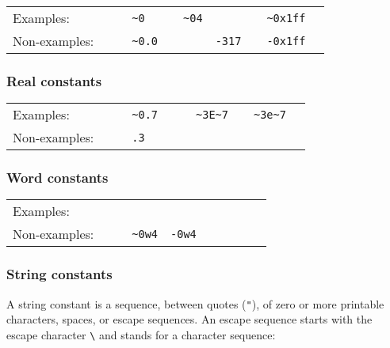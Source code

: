 \documentclass[fleqn]{article}
\begin{document}
\begin{quot}
\begin{tabular}{@{}lcllllllll}
Examples:   & &  \verb#0# & \verb#~0# & \verb#4# & \verb#~04# &
\verb#999999# & \verb#0xFFFF# & \verb#~0x1ff#\\
Non-examples: & & \verb#0.0# & \verb#~0.0# & \verb#4.0# & \verb#1E0# &
\verb#-317# & \verb#0XFFFF# & \verb#-0x1ff#\\
\end{tabular}
\end{quot}


\subsubsection*{Real constants}

\begin{quot}
\begin{tabular}{@{}lcllllllll}
Examples:   & &  \verb#0.7# & \verb#~0.7# & \verb#3.32E5# & \verb#3E~7#
 & \verb#~3E~7#  & \verb#3e~7# & \verb#~3e~7#\\
Non-examples: & & \verb#23# & \verb#.3# & \verb#4.E5# & \verb#1E2.0# & 
  \verb#1E+7# & \verb#1E-7#
\end{tabular}
\end{quot}


\subsubsection*{Word constants}

\begin{quot}
\begin{tabular}{@{}lcllllllll}
Examples:   & &  \verb#0w0# & \verb#0w4# & \verb#0w999999# &
\verb#0wxFFFF#  & \verb#0wx1ff#\\
Non-examples: & & \verb#0w0.0# & \verb#~0w4# & \verb#-0w4# & \verb#0w1E0# &
\verb#0wXFFFF# & \verb#0WxFFFF#\\
\end{tabular}
\end{quot}


\subsubsection*{String constants}

A string constant is a sequence, between quotes (\verb#"#), of zero or
more printable characters, spaces, or escape sequences.  An escape
sequence starts with the escape character \verb#\# and stands for a
character sequence:
\end{document}
